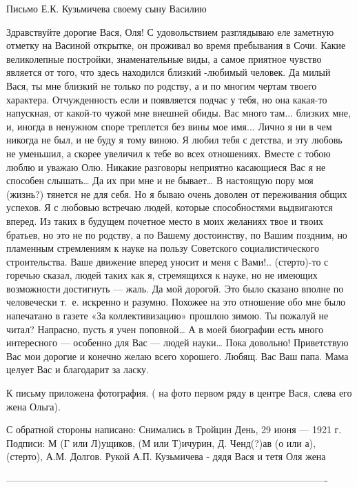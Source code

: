 Письмо Е.К. Кузьмичева своему сыну Василию


Здравствуйте дорогие Вася, Оля!
С удовольствием разглядываю еле заметную отметку на  Васиной открытке, он проживал во время пребывания в Сочи. Какие великолепные постройки, знаменательные виды, а самое приятное чувство является от того, что здесь находился близкий -любимый человек. Да милый Вася, ты мне близкий не только по родству, а и по многим чертам твоего характера. Отчужденность если и появляется подчас у тебя, но она какая-то напускная, от какой-то чужой  мне внешней обиды. Вас много там... близких мне, и, иногда в ненужном споре треплется без вины мое имя... Лично я ни в чем никогда не был, и не буду я тому виною. Я любил тебя с детства, и эту любовь не уменьшил, а скорее увеличил к тебе во всех отношениях. Вместе с тобою люблю и уважаю Олю. Никакие разговоры неприятно касающиеся Вас я не способен слышать… Да их при мне и не бывает…
В настоящую пору моя (жизнь?) тянется не для себя. Но я бываю очень доволен от переживания общих успехов. Я с любовью встречаю людей, которые способностями выдвигаются вперед. Из таких в будущем почетное место в моих желаниях твое и твоих братьев, но это не по родству, а по Вашему достоинству, по Вашим поздним, но пламенным стремлениям к науке на пользу Советского социалистического строительства. 
Ваше движение вперед уносит и меня с Вами!..
(стерто)-то с горечью сказал, людей таких как я, стремящихся к науке, но не имеющих возможности достигнуть — жаль. Да мой дорогой. Это было сказано вполне по человечески т. е. искренно и разумно. Похожее на это отношение обо мне было напечатано в газете «За коллективизацию» прошлою зимою. Ты пожалуй не читал? Напрасно, пусть я учен поповной… А в моей биографии есть много интересного — особенно для Вас — людей науки… Пока довольно! Приветствую Вас мои дорогие и конечно желаю всего хорошего.
Любящ. Вас Ваш папа.
Мама целует Вас и благодарит за ласку.

К письму приложена фотография. ( на фото первом ряду в центре Вася, слева его жена Ольга).  

С обратной стороны написано:
Снимались в Тройцин День, 29 июня — 1921 г.
Подписи: М (Г или Л)ущиков, (М или Т)ичурин, Д. Ченд(?)ав (о или а),  (стерто), А.М. Долгов. 
Рукой А.П. Кузьмичева -  дядя Вася и тетя Оля жена 

----------------------------------------------------------------------------------------------------





